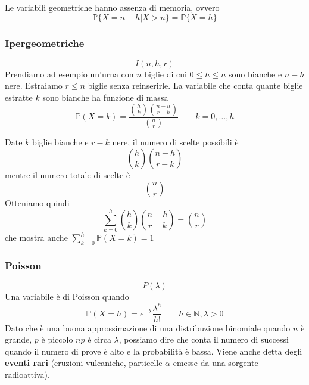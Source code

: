 \begin{observation}
	Le variabili geometriche hanno assenza di memoria, ovvero
	\begin{equation}
		\mathbb{P}\{X=n+h \vert X >n \} = \mathbb{P}\{X=h\}
	\end{equation}
\end{observation}

\subsubsection{Ipergeometriche}
\begin{equation}
	I(n,h,r)
\end{equation}
Prendiamo ad esempio un'urna con $n$ biglie di cui $0 \leq h \leq n$ sono bianche e $n-h$ nere. Estraiamo $r \leq n$ biglie senza reinserirle. La variabile che conta quante biglie estratte $k$ sono bianche ha funzione di massa
\begin{equation}
	\mathbb{P}(X=k) = \frac{\binom{h}{k}\binom{n-h}{r-k}}{\binom{n}{r}} \quad\quad k=0,\ldots, h
\end{equation}
\begin{proposition}
	Date $k$ biglie bianche e $r-k$ nere, il numero di scelte possibili è
	\begin{equation*}
		\binom{h}{k}\binom{n-h}{r-k}
	\end{equation*}
	mentre il numero totale di scelte è 
	\begin{equation*}
		\binom{n}{r}
	\end{equation*}
	Otteniamo quindi
	\begin{equation}
		\sum_{k=0}^{h} \binom{h}{k}\binom{n-h}{r-k} = \binom{n}{r}
	\end{equation}
	che mostra anche $\sum_{k=0}^{h}\mathbb{P}(X=k) = 1$
\end{proposition}

\subsubsection{Poisson}
\begin{equation}
	P(\lambda)
\end{equation}
Una variabile è di Poisson quando
\begin{equation}
	\mathbb{P}(X=h)=e^{-\lambda}\frac{\lambda^h}{h!} \quad\quad h \in \mathbb{N}, \lambda>0
\end{equation}
Dato che è una buona approssimazione di una distribuzione binomiale quando $n$ è grande, $p$ è piccolo $np$ è circa $\lambda$, possiamo dire che conta il numero di successi quando il numero di prove è alto e la probabilità è bassa. Viene anche detta degli \textbf{eventi rari} (eruzioni vulcaniche, particelle $\alpha$ emesse da una sorgente radioattiva).

